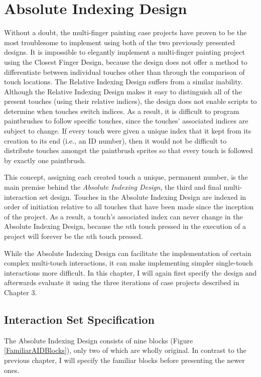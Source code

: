\chapter{Absolute Indexing Design}

Without a doubt, the multi-finger painting case projects have proven to be the most troublesome to implement using both of the two previously presented designs. It is impossible to elegantly implement a multi-finger painting project using the Closest Finger Design, because the design does not offer a method to differentiate between individual touches other than through the comparison of touch locations. The Relative Indexing Design suffers from a similar inability. Although the Relative Indexing Design makes it easy to distinguish all of the present touches (using their relative indices), the design does not enable scripts to determine when touches switch indices. As a result, it is difficult to program paintbrushes to follow specific touches, since the touches' associated indices are subject to change. If every touch were given a unique index that it kept from its creation to its end (i.e., an ID number), then it would not be difficult to distribute touches amongst the paintbrush sprites so that every touch is followed by exactly one paintbrush.

This concept, assigning each created touch a unique, permanent  number, is the main premise behind the \emph{Absolute Indexing Design}, the third and final multi-interaction set design. Touches in the Absolute Indexing Design are indexed in order of initiation relative to all touches that have been made since the inception of the project. As a result, a touch's associated index can never change in the Absolute Indexing Design, because the $n$th touch pressed in the execution of a project will forever be the $n$th touch pressed.

While the Absolute Indexing Design can facilitate the implementation of certain complex multi-touch interactions, it can make implementing simpler single-touch interactions more difficult. In this chapter, I will again first specify the design and afterwards evaluate it using the three iterations of case projects described in Chapter 3.

\section{Interaction Set Specification}

The Absolute Indexing Design consists of nine blocks (Figure \ref{FamiliarAIDBlocks}), only two of which are wholly original. In contrast to the previous chapter, I will specify the familiar blocks before presenting the newer ones.

